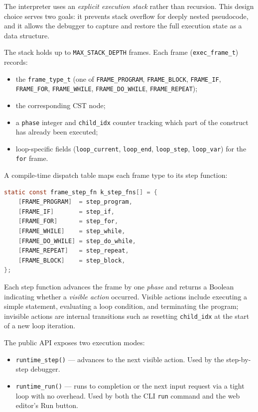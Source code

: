 The interpreter uses an \emph{explicit execution stack} rather than recursion.
This design choice serves two goals: it prevents stack overflow for deeply
nested pseudocode, and it allows the debugger to capture and restore the full
execution state as a data structure.

The stack holds up to \texttt{MAX\_STACK\_DEPTH} frames.  Each frame
(\texttt{exec\_frame\_t}) records:

\begin{itemize}
  \item the \texttt{frame\_type\_t} (one of
        \texttt{FRAME\_PROGRAM}, \texttt{FRAME\_BLOCK}, \texttt{FRAME\_IF},
        \texttt{FRAME\_FOR}, \texttt{FRAME\_WHILE}, \texttt{FRAME\_DO\_WHILE},
        \texttt{FRAME\_REPEAT});
  \item the corresponding CST node;
  \item a \texttt{phase} integer and \texttt{child\_idx} counter tracking
        which part of the construct has already been executed;
  \item loop-specific fields (\texttt{loop\_current}, \texttt{loop\_end},
        \texttt{loop\_step}, \texttt{loop\_var}) for the \texttt{for} frame.
\end{itemize}

A compile-time dispatch table maps each frame type to its step function:

\begin{lstlisting}[language=C, basicstyle=\ttfamily\small]
static const frame_step_fn k_step_fns[] = {
    [FRAME_PROGRAM]  = step_program,
    [FRAME_IF]       = step_if,
    [FRAME_FOR]      = step_for,
    [FRAME_WHILE]    = step_while,
    [FRAME_DO_WHILE] = step_do_while,
    [FRAME_REPEAT]   = step_repeat,
    [FRAME_BLOCK]    = step_block,
};
\end{lstlisting}

Each step function advances the frame by one \emph{phase} and returns a
Boolean indicating whether a \emph{visible action} occurred.  Visible actions
include executing a simple statement, evaluating a loop condition, and
terminating the program; invisible actions are internal transitions such as
resetting \texttt{child\_idx} at the start of a new loop iteration.

The public API exposes two execution modes:

\begin{itemize}
  \item \texttt{runtime\_step()} --- advances to the next visible action.
        Used by the step-by-step debugger.
  \item \texttt{runtime\_run()} --- runs to completion or the next input
        request via a tight loop with no overhead.  Used by both the CLI
        \texttt{run} command and the web editor's Run button.
\end{itemize}

